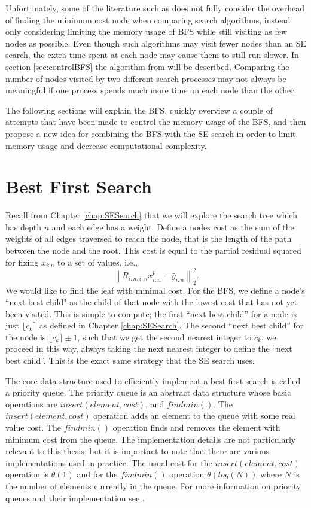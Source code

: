 \documentclass[12pt,Bold,letterpaper]{mcgilletdclass}
\newcommand{\vsp}{\vspace{\baselineskip}}
\begin{document}
Unfortunately, some of the literature such as \cite{StuBF07} does not fully consider the overhead of finding the minimum cost node when comparing search algorithms, instead only considering limiting the memory usage of BFS while still visiting as few nodes as possible. Even though such algorithms may visit fewer nodes than an SE search, the extra time spent at each node may cause them to still run slower. In section \ref{sec:controlBFS} the algorithm from \cite{StuBF07} will be described. Comparing the number of nodes visited by two different search processes may not always be meaningful if one process spends much more time on each node than the other.

The following sections will explain the BFS, quickly overview a couple of attempts that have been made to control the memory usage of the BFS, and then propose a new idea for combining the BFS with the SE search in order to limit memory usage and decrease computational complexity.

\vsp \section{Best First Search} \label{sec:BFS}

Recall from Chapter \ref{chap:SESearch} that we will explore the search tree which has depth $n$ and each edge has a weight. Define a  nodes cost as the sum of the  weights of all edges traversed to reach the node, that is the length of the path between the node and the root. This cost is equal to the partial residual squared for fixing $x_{i:n}$ to a set of values, i.e., $$\left \| R_{i:n,i:n}x_{i:n}^p - \bar{y}_{i:n}\right \|_2^2.$$ We would like to find the leaf with minimal cost. For the BFS, we define a node's ``next best child" as the child of that node with the lowest cost that has not yet been visited. This is simple to compute; the first ``next best child'' for a node is just $\lfloor c_k \rceil$ as defined in Chapter \ref{chap:SESearch}. The second ``next best child'' for the node is $\lfloor c_k \rceil \pm 1$, such that we get the second nearest integer to $c_k$, we proceed in this way, always taking the next nearest integer to define the ``next best child''. This is the exact same strategy that the SE search uses.

The core data structure used to efficiently implement a best first search is called a priority queue. The priority queue is an abstract data structure whose basic operations are $insert(element,cost)$, and $findmin()$. The $insert(element,cost)$ operation adds an element to the queue with some real value cost. The $findmin()$ operation finds and removes the element with minimum cost from the queue. The implementation details are not particularly relevant to this thesis, but it is important to note that there are various implementations used in practice. The usual cost for the $insert(element,cost)$ operation is $\theta(1)$ and for the $findmin()$ operation $\theta(log(N))$ where $N$ is the number of elements currently in the queue. For more information on priority queues and their implementation see \cite{AhoHU83}.
\end{document}
